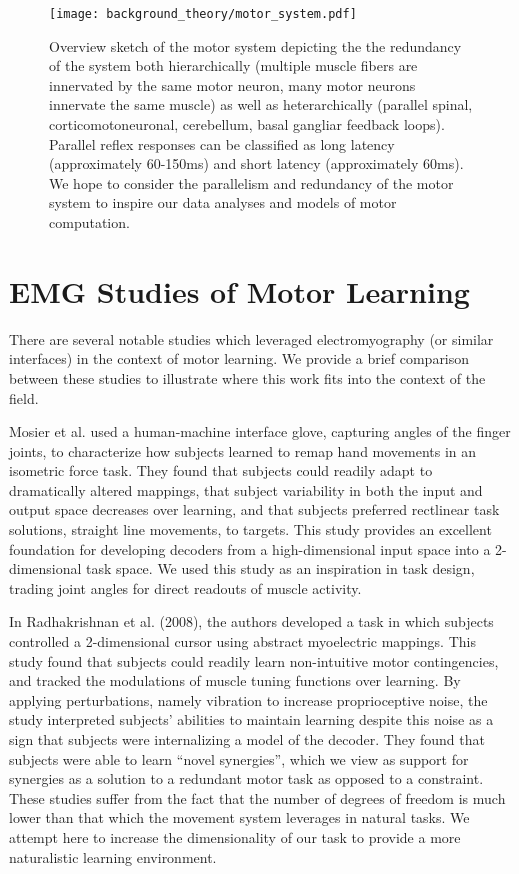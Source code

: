 \documentclass[../main.tex]{subfiles}
\begin{document}
\begin{figure}[!htb]
\centering
\texttt{[image: background\_theory/motor\_system.pdf]}
\caption[Motor sytem schematic]{Overview sketch of the motor system depicting the the redundancy of the system both hierarchically (multiple muscle fibers are innervated by the same motor neuron, many motor neurons innervate the same muscle) as well as heterarchically (parallel spinal, corticomotoneuronal, cerebellum, basal gangliar feedback loops). Parallel reflex responses can be classified as long latency (approximately 60-150ms) and short latency (approximately 60ms). We hope to consider the parallelism and redundancy of the motor system to inspire our data analyses and models of motor computation.}\label{fig:motor_system}
\end{figure}





\section{EMG Studies of Motor Learning}

There are several notable studies which leveraged electromyography (or similar interfaces) in the context of motor learning. We provide a brief comparison between these studies to illustrate where this work fits into the context of the field.

Mosier et al.\cite{MosierRemappingHandMovements2005} used a human-machine interface glove, capturing angles of the finger joints, to characterize how subjects learned to remap hand movements in an isometric force task. They found that subjects could readily adapt to dramatically altered mappings, that subject variability in both the input and output space decreases over learning, and that subjects preferred rectlinear task solutions, straight line movements, to targets. This study provides an excellent foundation for developing decoders from a high-dimensional input space into a 2-dimensional task space. We used this study as an inspiration in task design, trading joint angles for direct readouts of muscle activity.

In Radhakrishnan et al. (2008)\cite{radhakrishnanLearningNovelMyoelectricControlled2008,Mussa-IvaldiSensoryMotorRemapping2011}, the authors developed a task in which subjects controlled a 2-dimensional cursor using abstract myoelectric mappings. This study found that subjects could readily learn non-intuitive motor contingencies, and tracked the modulations of muscle tuning functions over learning. By applying perturbations, namely vibration to increase proprioceptive noise, the study interpreted subjects' abilities to maintain learning despite this noise as a sign that subjects were internalizing a model of the decoder. They found that subjects were able to learn ``novel synergies'', which we view as support for synergies as a solution to a redundant motor task as opposed to a constraint. These studies suffer from the fact that the number of degrees of freedom is much lower than that which the movement system leverages in natural tasks. We attempt here to increase the dimensionality of our task to provide a more naturalistic learning environment.
\end{document}
